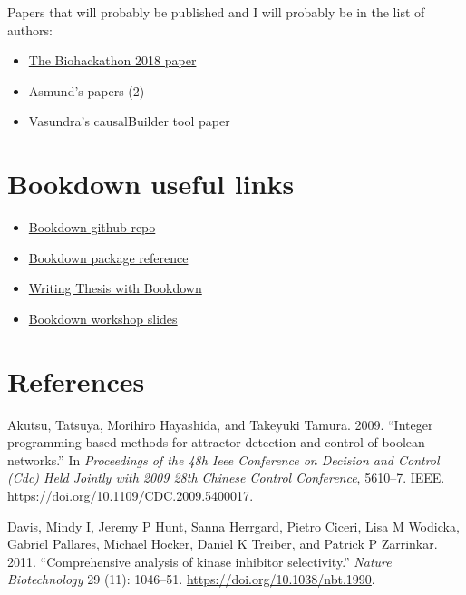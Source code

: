 \documentclass[
  12pt,
]{book}
\providecommand{\tightlist}{%
  \setlength{\itemsep}{0pt}\setlength{\parskip}{0pt}}
\begin{document}
Papers that will probably be published and I will probably be in the list of authors:

\begin{itemize}
\tightlist
\item
  \href{https://www.tinyurl.com/bh2018write}{The Biohackathon 2018 paper}
\item
  Asmund's papers (2)
\item
  Vasundra's causalBuilder tool paper
\end{itemize}

\hypertarget{bookdown-useful-links}{%
\chapter*{Bookdown useful links}\label{bookdown-useful-links}}

\begin{itemize}
\tightlist
\item
  \href{https://github.com/rstudio/bookdown/}{Bookdown github repo}
\item
  \href{https://bookdown.org/yihui/bookdown/}{Bookdown package reference}
\item
  \href{https://eddjberry.netlify.com/post/writing-your-thesis-with-bookdown/}{Writing Thesis with Bookdown}
\item
  \href{https://arm.rbind.io/slides/bookdown.html}{Bookdown workshop slides}
\end{itemize}

\hypertarget{references}{%
\chapter*{References}\label{references}}

\hypertarget{refs}{}
\leavevmode\hypertarget{ref-Akutsu2009}{}%
Akutsu, Tatsuya, Morihiro Hayashida, and Takeyuki Tamura. 2009. ``Integer programming-based methods for attractor detection and control of boolean networks.'' In \emph{Proceedings of the 48h Ieee Conference on Decision and Control (Cdc) Held Jointly with 2009 28th Chinese Control Conference}, 5610--7. IEEE. \url{https://doi.org/10.1109/CDC.2009.5400017}.

\leavevmode\hypertarget{ref-Davis2011}{}%
Davis, Mindy I, Jeremy P Hunt, Sanna Herrgard, Pietro Ciceri, Lisa M Wodicka, Gabriel Pallares, Michael Hocker, Daniel K Treiber, and Patrick P Zarrinkar. 2011. ``Comprehensive analysis of kinase inhibitor selectivity.'' \emph{Nature Biotechnology} 29 (11): 1046--51. \url{https://doi.org/10.1038/nbt.1990}.
\end{document}
